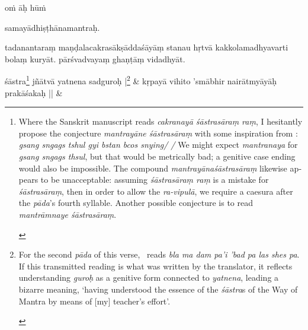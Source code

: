\documentclass[naipra.tex]{subfiles}
\begin{document}
\begin{sanskrit}

\pstart
\begin{mantra}oṁ āḥ hūṁ\end{mantra}\Emdash samayādhiṣṭhānamantraḥ. 
\pend



\pstart
tadanantaraṃ maṇḍalacakrasākṣāddaśāyāṃ stanau hṛtvā  kakkolamadhyavarti bolaṃ kuryāt. pārśvadvayaṃ ghaṇṭāṃ vidadhyāt. 
\pend


\medskip\versequote
{} śāstra\footnote{
	\begin{english}%
		Where the Sanskrit manuscript reads \emph{cakranayā śāstrasāraṃ raṃ}, I hesitantly propose the conjecture \emph{mantrayāne śāstrasāraṃ} with some inspiration from \TIB : \emph{gsang sngags tshul gyi bstan bcos snying/ /}
		We might expect \emph{mantranaya} for \emph{gsang sngags thsul}, but that would be metrically bad; a genitive case ending would also be impossible.
		The compound \emph{mantrayānaśāstrasāraṃ} likewise appears to be unacceptable: assuming \emph{śāstrasāraṃ raṃ} is a mistake for \emph{śāstrasāraṃ}, then in order to allow the \emph{ra-vipulā}, we require a caesura after the \emph{pāda}'s fourth syllable.
		Another possible conjecture is to read \emph{mantrāmnaye śāstrasāraṃ}.
	\end{english}
} jñātvā yatnena sadguroḥ |\footnote{
	\begin{english}%
		For the second \emph{pāda} of this verse, \TIB\ reads \emph{bla ma dam pa'i 'bad pa las shes pa}. If this transmitted reading is what was written by the translator, it reflects understanding \emph{guroḥ} as a genitive form connected to \emph{yatnena}, leading a bizarre meaning, `having understood the essence of the \emph{śāstra}s of the Way of Mantra by means of [my] teacher's effort'.
	\end{english}
} &
kṛpayā vihito 'smābhir nairātmyāyāḥ prakāśakaḥ || \&


\end{sanskrit}
\end{document}
